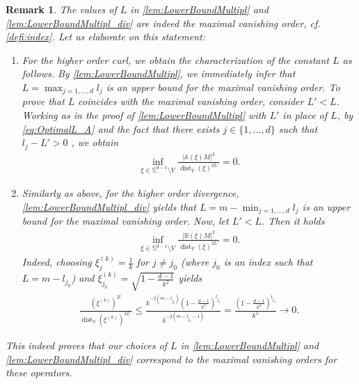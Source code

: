 \documentclass[a4paper, 10pt, twoside, notitlepage]{amsart}
\theoremstyle{plain}
\newtheorem{rmk}[prop]{Remark}
\renewcommand{\AA}{\mathbb{A}}
\DeclareMathOperator{\dist}{dist}
\begin{document}
		 
			\begin{rmk}
			\label{rmk:opt}
				The values of $L$ in \cref{lem:LowerBoundMultipl} and \cref{lem:LowerBoundMultipl_div} are indeed the maximal vanishing order, cf. \cref{defi:index}.  Let us elaborate on this statement:
                                \renewcommand{\labelenumi}{\textbf{\theenumi}} \renewcommand{\theenumi}{(\roman{enumi})}
				\begin{enumerate}
                                \item For the higher order curl, we obtain the characterization of the constant $L$ as follows. By \cref{lem:LowerBoundMultipl}, we immediately infer that $L = \max_{j=1,\dots,d} l_j$ is an upper bound for the maximal vanishing order. To prove that $L$ coincides with the maximal vanishing order, consider $L' < L$. Working as in the proof of \cref{lem:LowerBoundMultipl} with $L'$ in place of $L$, by \cref{eq:OptimalL_A} and the fact that there exists $j \in \{1,\dots,d\}$ such that $l_j -L' > 0$ , we obtain
                                    \begin{align*}
                                      \inf_{\xi \in \mathbb{S}^{d-1} \setminus V} \frac{|\AA(\xi)M|^2}{\dist_V(\xi)^{2L'}} = 0.
                                    \end{align*}
                                \item Similarly as above, for the higher order divergence, \cref{lem:LowerBoundMultipl_div} yields that $L = m - \min_{j=1,\dots,d}l_j$ is an upper bound for the maximal vanishing order.
                                  Now, let
                                  $L' < L$. Then it holds
					\begin{align*}
						\inf_{\xi \in \mathbb{S}^{d-1} \setminus V} \frac{|\mathbb{B}(\xi)M|^2}{\dist_V(\xi)^{2L'}} = 0.
					\end{align*}
					Indeed, choosing $\xi^{(k)}_j = \frac{1}{k}$ for $j \neq j_0$ (where $j_0$ is an index such that $L = m - l_{j_0}$) and $\xi^{(k)}_{j_0} = \sqrt{1-\frac{d-1}{k^2}}$ yields
					\begin{align*}
						\frac{(\xi^{(k)})^{2l}}{\dist_V(\xi^{(k)})^{2L'}} \leq \frac{k^{-2(m-l_{j_0})}(1-\frac{d-1}{k^2})^{l_{j_0}}}{k^{-2(m-l_{j_0}-1)}} = \frac{(1-\frac{d-1}{k^2})^{l_{j_0}}}{k^2} \to 0.
					\end{align*}
				\end{enumerate}
				This indeed proves that our choices of $L$ in \cref{lem:LowerBoundMultipl} and \cref{lem:LowerBoundMultipl_div} correspond to the maximal vanishing orders for these operators.
			\end{rmk}
		
\end{document}
